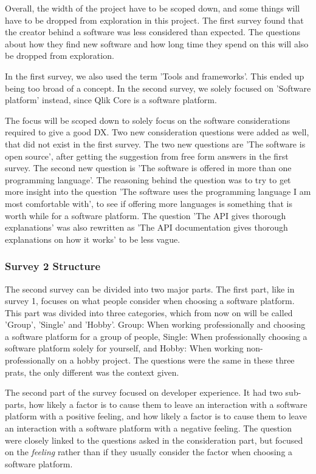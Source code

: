 \documentclass{article}
\begin{document}
Overall, the width of the project have to be scoped down, and some
things will have to be dropped from exploration in this project. The
first survey found that the creator behind a software was less
considered than expected. The questions about how they find new software
and how long time they spend on this will also be dropped from
exploration.

In the first survey, we also used the term 'Tools and frameworks'. This
ended up being too broad of a concept. In the second survey, we solely
focused on 'Software platform' instead, since Qlik Core is a software platform.

The focus will be scoped down to solely focus on the software
considerations required to give a good DX. Two new consideration
questions were added as well, that did not exist in the first survey.
The two new questions are 'The software is open source', after getting
the suggestion from free form answers in the first survey. The second
new question is 'The software is offered in more than one programming
language'. The reasoning behind the question was to try to get more
insight into the question 'The software uses the programming language I
am most comfortable with', to see if offering more languages is
something that is worth while for a software platform. The question 'The
API gives thorough explanations' was also rewritten as 'The API
documentation gives thorough explanations on how it works' to be less
vague.

\subsubsection{Survey 2 Structure}

The second survey can be divided into two major parts. The first part,
like in survey 1, focuses on what people consider when choosing a
software platform. This part was divided into three categories, which
from now on will be called 'Group', 'Single' and 'Hobby'. Group: When
working professionally and choosing a software platform for a group of
people, Single: When professionally choosing a software platform solely
for yourself, and Hobby: When working non-professionally on a hobby
project. The questions were the same in these three prats, the only
different was the context given.

The second part of the survey focused on developer experience. It had
two sub-parts, how likely a factor is to cause them to leave an
interaction with a software platform with a positive feeling, and how
likely a factor is to cause them to leave an interaction with a software
platform with a negative feeling. The question were closely linked to
the questions asked in the consideration part, but focused on the
\textit{feeling} rather than if they usually consider the factor when choosing
a software platform.
\end{document}

